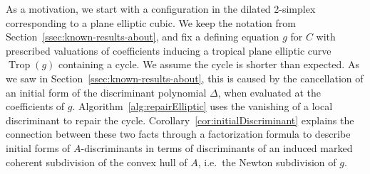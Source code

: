\documentclass[11pt]{amsart}
\numberwithin{equation}{section}
\theoremstyle{plain}
\theoremstyle{definition}
\theoremstyle{remark}
\begin{document}
As a motivation, we start with a configuration in the dilated
2-simplex corresponding to a plane elliptic cubic. We keep the
notation from Section~\ref{ssec:known-results-about}, and fix a
defining equation $g$ for $C$ with prescribed valuations of
coefficients inducing a tropical plane elliptic curve $\operatorname{Trop}(g)$
containing a cycle. We assume the cycle is shorter than expected. As
we saw in Section~\ref{ssec:known-results-about}, this is caused by
the cancellation of an initial form of the discriminant polynomial
$\Delta$, when evaluated at the coefficients of $g$.
Algorithm~\ref{alg:repairElliptic} uses the vanishing of a local
discriminant to repair the
cycle. Corollary~\ref{cor:initialDiscriminant} explains the connection
between these two facts through a factorization formula to describe
initial forms of $A$-discriminants in terms of discriminants of an
induced marked coherent subdivision of the convex hull of $A$, i.e.\
the Newton subdivision of $g$.
\end{document}
